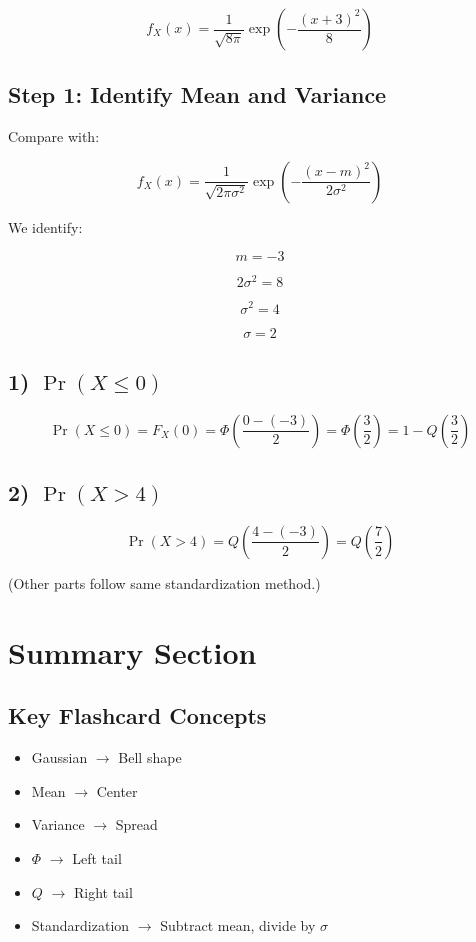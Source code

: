\documentclass[11pt]{article}
\begin{document}
\[
f_X(x)
=
\frac{1}{\sqrt{8\pi}}
\exp
\left(
-\frac{(x+3)^2}{8}
\right)
\]

\subsection*{Step 1: Identify Mean and Variance}

Compare with:

\[
f_X(x)=
\frac{1}{\sqrt{2\pi\sigma^2}}
\exp
\left(
-\frac{(x-m)^2}{2\sigma^2}
\right)
\]

We identify:

\[
m = -3
\]

\[
2\sigma^2 = 8
\]

\[
\sigma^2 = 4
\]

\[
\sigma = 2
\]

\subsection*{1) $\Pr(X \le 0)$}

\[
\Pr(X \le 0)
=
F_X(0)
=
\Phi
\left(
\frac{0-(-3)}{2}
\right)
=
\Phi
\left(
\frac{3}{2}
\right)
=
1 -
Q
\left(
\frac{3}{2}
\right)
\]

\subsection*{2) $\Pr(X > 4)$}

\[
\Pr(X > 4)
=
Q
\left(
\frac{4-(-3)}{2}
\right)
=
Q
\left(
\frac{7}{2}
\right)
\]

(Other parts follow same standardization method.)

\newpage

\section*{Summary Section}

\subsection*{Key Flashcard Concepts}

\begin{itemize}
    \item Gaussian $\rightarrow$ Bell shape
    \item Mean $\rightarrow$ Center
    \item Variance $\rightarrow$ Spread
    \item $\Phi$ $\rightarrow$ Left tail
    \item $Q$ $\rightarrow$ Right tail
    \item Standardization $\rightarrow$ Subtract mean, divide by $\sigma$
\end{itemize}
\end{document}

